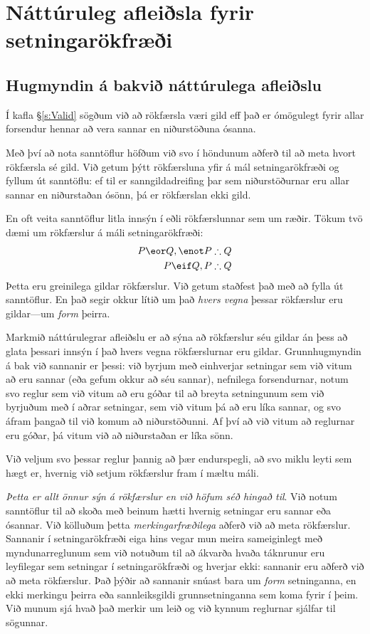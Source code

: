 \part{Náttúruleg afleiðsla fyrir setningarökfræði}
\label{ch.NDTFL}

\chapter{Hugmyndin á bakvið náttúrulega afleiðslu}\label{s:NDVeryIdea}

Í kafla \S\ref{s:Valid} sögðum við að rökfærsla væri gild eff það er ómögulegt fyrir allar forsendur hennar að vera sannar en niðurstöðuna ósanna. 

Með því að nota sanntöflur höfðum við svo í höndunum aðferð til að meta hvort rökfærsla sé gild. Við getum þýtt rökfærsluna yfir á mál setningarökfræði og fyllum út sanntöflu: ef til er sanngildadreifing þar sem niðurstöðurnar eru allar sannar en niðurstaðan ósönn, þá er rökfærslan ekki gild.

En oft veita sanntöflur litla innsýn í eðli rökfærslunnar sem um ræðir. Tökum tvö dæmi um rökfærslur á máli setningarökfræði:
\begin{align*}
P \eor Q, \enot P & \therefore Q\\
P \eif Q, P & \therefore Q
\end{align*}
Þetta eru greinilega gildar rökfærslur. Við getum staðfest það með að fylla út sanntöflur. En það segir okkur lítið um það \emph{hvers vegna} þessar rökfærslur eru gildar---um \emph{form} þeirra.

Markmið náttúrulegrar afleiðslu er að sýna að rökfærslur séu gildar án þess að glata þessari innsýn í það hvers vegna rökfærslurnar eru gildar. Grunnhugmyndin á bak við sannanir er þessi: við byrjum með einhverjar setningar sem við vitum að eru sannar (eða gefum okkur að séu sannar), nefnilega forsendurnar, notum svo reglur sem við vitum að eru góðar til að breyta setningunum sem við byrjuðum með í aðrar setningar, sem við vitum þá að eru líka sannar, og svo áfram þangað til við komum að niðurstöðunni. Af því að við vitum að reglurnar eru góðar, þá vitum við að niðurstaðan er líka sönn. 

Við veljum svo þessar reglur þannig að þær endurspegli, að svo miklu leyti sem hægt er, hvernig við setjum rökfærslur fram í mæltu máli. 

\emph{Þetta er allt önnur sýn á rökfærslur en við höfum séð hingað til}. Við notum sanntöflur til að skoða með beinum hætti hvernig setningar eru sannar eða ósannar. Við kölluðum þetta \emph{merkingarfræðilega} aðferð við að meta rökfærslur. Sannanir í setningarökfræði eiga hins vegar mun meira sameiginlegt með myndunarreglunum sem við notuðum til að ákvarða hvaða táknrunur eru leyfilegar sem setningar í setningarökfræði og hverjar ekki: sannanir eru  aðferð við að meta rökfærslur. Það þýðir að sannanir snúast bara um \emph{form} setninganna, en ekki merkingu þeirra eða sannleiksgildi grunnsetninganna sem koma fyrir í þeim. Við munum sjá hvað það merkir um leið og við kynnum reglurnar sjálfar til sögunnar. 

